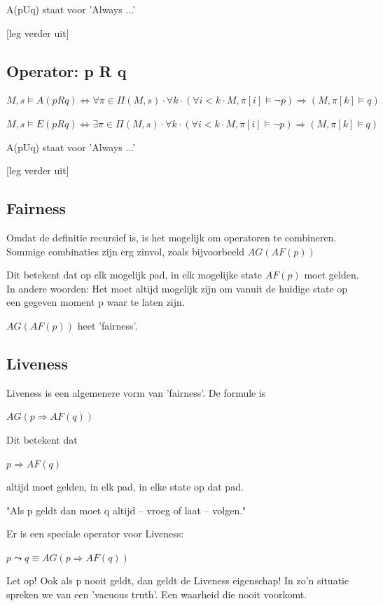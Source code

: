 \documentclass{article}
\begin{document}
		A(pUq) staat voor 'Always ...' 

		[leg verder uit] 		

		\subsection{Operator: p R q}
				
		\( M, s \models A(pRq) \iff \forall \pi \in \Pi (M, s) \cdot \forall k \cdot (\forall i < k \cdot M, \pi [i] \models \neg p) \Rightarrow (M, \pi [k] \models q) \)

		\( M, s \models E(pRq) \iff \exists \pi \in \Pi (M, s) \cdot \forall k \cdot (\forall i < k \cdot M, \pi [i] \models \neg p) \Rightarrow (M, \pi [k] \models q) \)

		A(pUq) staat voor 'Always ...' 

		[leg verder uit] 		
		
		\subsection{Fairness}
				
		Omdat de definitie recursief is, is het mogelijk om operatoren te combineren. Sommige combinaties zijn erg zinvol, zoals bijvoorbeeld \( AG ( AF (p) )\)

		Dit betekent dat op elk mogelijk pad, in elk mogelijke state \( AF(p) \) moet gelden. In andere woorden: Het moet altijd mogelijk zijn om vanuit de huidige state op een gegeven moment p waar te laten zijn. 

		\( AG ( AF ( p ) ) \) heet 'fairness'.
		
		\subsection{Liveness}
			
		Liveness is een algemenere vorm van 'fairness'. De formule is 

		\( AG (p \Rightarrow AF(q)) \) 

		Dit betekent dat 

		 \( p \Rightarrow AF(q) \) 

		altijd moet gelden, in elk pad, in elke state op dat pad.

		"Als p geldt dan moet q altijd -- vroeg of laat -- volgen."

		Er is een speciale operator voor Liveness:

		\( p \leadsto q \equiv AG (p \Rightarrow AF (q) ) \)

		Let op! Ook als p nooit geldt, dan geldt de Liveness eigenschap! In zo'n situatie spreken we van een 'vacuous truth'. Een waarheid die nooit voorkomt.
		
	
	\newpage
	
	
	
	
\end{document}
